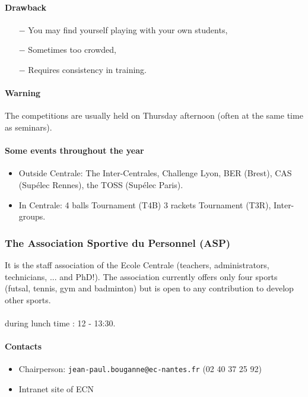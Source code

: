 \paragraph{Drawback}
\begin{itemize}
  \item [$-$] You may find yourself playing with your own students,
  \item [$-$] Sometimes too crowded,
  \item [$-$] Requires consistency in training.
\end{itemize}

\paragraph{Warning} The competitions are usually held on Thursday afternoon (often at the same time as seminars).


\paragraph{Some events throughout the year}
\begin{itemize}
  \item Outside Centrale: The Inter-Centrales, Challenge Lyon, BER (Brest), CAS (Supélec Rennes), the TOSS (Supélec Paris).
  \item In Centrale:  4 balls Tournament (T4B) 3 rackets Tournament (T3R), Inter-groups.
\end{itemize}

\subsubsection {The Association Sportive du Personnel (ASP)}
It is the staff association of the Ecole Centrale (teachers, administrators, technicians, ... and PhD!). The association currently offers only four sports (futsal, tennis, gym and badminton) but is open to any contribution to develop other sports.

\paragraph{} during lunch time : 12 - 13:30.
\paragraph{Contacts}
\begin {itemize}
  \item Chairperson: \texttt{jean-paul.bouganne@ec-nantes.fr} (02 40 37 25 92)
  \item Intranet site of ECN
\end {itemize}
